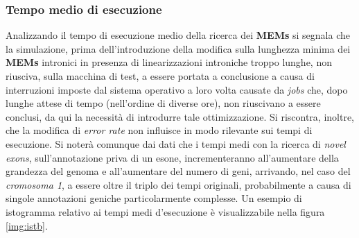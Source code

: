 \documentclass[a4paper,12pt, oneside]{book}
\begin{document}
\subsubsection{Tempo medio di esecuzione}
Analizzando il tempo di esecuzione medio della ricerca dei \textbf{MEMs} si
segnala che la simulazione, prima dell'introduzione della modifica sulla
lunghezza minima dei \textbf{MEMs} intronici in presenza di linearizzazioni
introniche troppo lunghe, non riusciva, sulla macchina di test,
a essere portata a conclusione a causa di interruzioni imposte dal sistema
operativo a loro volta causate da \textit{jobs} che, dopo lunghe attese di tempo
(nell'ordine 
di diverse ore), non
riuscivano a essere conclusi, da qui la necessità di introdurre tale
ottimizzazione. Si riscontra, inoltre, che la modifica di \textit{error rate}
non influisce in modo rilevante sui tempi di esecuzione. Si noterà comunque dai
dati che i tempi medi con la ricerca di \textit{novel exons}, sull'annotazione
priva di un esone, incrementeranno all'aumentare della grandezza del genoma e
all'aumentare del numero di geni, arrivando, nel caso del \textit{cromosoma 1},
a essere oltre il triplo dei tempi originali, probabilmente a causa di singole
annotazioni geniche particolarmente complesse. Un esempio di istogramma
relativo ai tempi medi d'esecuzione è visualizzabile nella figura
\ref{img:istb}. 
\end{document}
